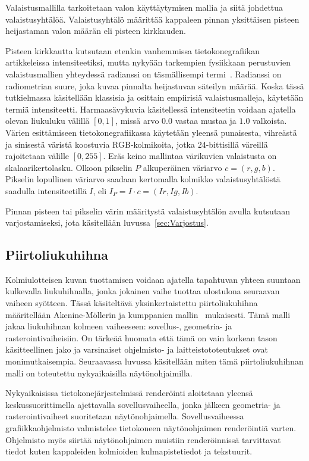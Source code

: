 \documentclass[finnish]{tktltiki2}
\theoremstyle{definition}
\theoremstyle{remark}
\begin{document}
Valaistusmallilla tarkoitetaan valon käyttäytymisen mallia ja siitä johdettua valaistusyhtälöä. Valaistusyhtälö määrittää kappaleen pinnan yksittäisen pisteen heijastaman valon määrän eli pisteen kirkkauden.

Pisteen kirkkautta kutsutaan etenkin vanhemmissa tietokonegrafiikan artikkeleissa intensiteetiksi, mutta nykyään tarkempien fysiikkaan perustuvien valaistusmallien yhteydessä radianssi on täsmällisempi termi~\cite[s. 700]{Hughes}. Radianssi on radiometrian suure, joka kuvaa pinnalta heijastuvan säteilyn määrää. Koska tässä tutkielmassa käsitellään klassisia ja osittain empiirisiä valaistusmalleja, käytetään termiä intensiteetti. Harmaasävykuvia käsitellessä intensiteetin voidaan ajatella olevan liukuluku välillä $[0, 1]$, missä arvo $0.0$ vastaa mustaa ja $1.0$ valkoista. Värien esittämiseen tietokonegrafiikassa käytetään yleensä punaisesta, vihreästä ja sinisestä väristä koostuvia RGB-kolmikoita, jotka 24-bittisillä väreillä rajoitetaan välille $[0, 255]$. Eräs keino mallintaa värikuvien valaistusta on skalaarikertolasku. Olkoon pikselin $P$ alkuperäinen väriarvo $c = (r, g, b)$. Pikselin lopullinen väriarvo saadaan kertomalla kolmikko valaistusyhtälöstä saadulla intensiteetillä $I$, eli $I_P = I\cdot c = (Ir, Ig, Ib)$.

Pinnan pisteen tai pikselin värin määritystä valaistusyhtälön avulla kutsutaan varjostamiseksi, jota käsitellään luvussa~\ref{sec:Varjostus}.

\subsection{Piirtoliukuhihna}
Kolmiulotteisen kuvan tuottamisen voidaan ajatella tapahtuvan yhteen suuntaan kulkevalla liukuhihnalla, jonka jokainen vaihe tuottaa ulostulona seuraavan vaiheen syötteen. Tässä käsiteltävä yksinkertaistettu piirtoliukuhihna määritellään Akenine-Möllerin ja kumppanien mallin~\cite[s. 11-27]{Moller} mukaisesti. Tämä malli jakaa liukuhihnan kolmeen vaiheeseen: sovellus-, geometria- ja rasterointivaiheisiin. On tärkeää huomata että tämä on vain korkean tason käsitteellinen jako ja varsinaiset ohjelmisto- ja laitteistototeutukset ovat monimutkaisempia. Seuraavassa luvussa käsitellään miten tämä piirtoliukuhihnan malli on toteutettu nykyaikaisilla näytönohjaimilla.

Nykyaikaisissa tietokonejärjestelmissä renderöinti aloitetaan yleensä keskussuorittimella ajettavalla sovellusvaiheella, jonka jälkeen geometria- ja rasterointivaiheet suoritetaan näytönohjaimella. Sovellusvaiheessa grafiikkaohjelmisto valmistelee tietokoneen näytönohjaimen renderöintiä varten. Ohjelmisto myös siirtää näytönohjaimen muistiin renderöinnissä tarvittavat tiedot kuten kappaleiden kolmioiden kulmapistetiedot ja tekstuurit. 
\end{document}
